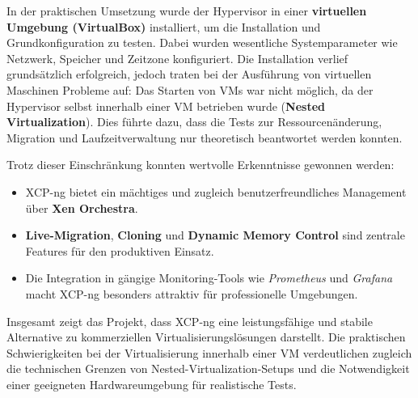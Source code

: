 \documentclass[BMR,Seminar,ngerman,IEEE]{twbook}
\begin{document}
In der praktischen Umsetzung wurde der Hypervisor in einer \textbf{virtuellen Umgebung (VirtualBox)} installiert, um die Installation und Grundkonfiguration zu testen. Dabei wurden wesentliche Systemparameter wie Netzwerk, Speicher und Zeitzone konfiguriert. Die Installation verlief grundsätzlich erfolgreich, jedoch traten bei der Ausführung von virtuellen Maschinen Probleme auf:  
Das Starten von VMs war nicht möglich, da der Hypervisor selbst innerhalb einer VM betrieben wurde (\textbf{Nested Virtualization}). Dies führte dazu, dass die Tests zur Ressourcenänderung, Migration und Laufzeitverwaltung nur theoretisch beantwortet werden konnten.

Trotz dieser Einschränkung konnten wertvolle Erkenntnisse gewonnen werden:
\begin{itemize}[noitemsep]
    \item XCP-ng bietet ein mächtiges und zugleich benutzerfreundliches Management über \textbf{Xen Orchestra}.
    \item \textbf{Live-Migration}, \textbf{Cloning} und \textbf{Dynamic Memory Control} sind zentrale Features für den produktiven Einsatz.
    \item Die Integration in gängige Monitoring-Tools wie \textit{Prometheus} und \textit{Grafana} macht XCP-ng besonders attraktiv für professionelle Umgebungen.
\end{itemize}

Insgesamt zeigt das Projekt, dass XCP-ng eine leistungsfähige und stabile Alternative zu kommerziellen Virtualisierungslösungen darstellt.  
Die praktischen Schwierigkeiten bei der Virtualisierung innerhalb einer VM verdeutlichen zugleich die technischen Grenzen von Nested-Virtualization-Setups und die Notwendigkeit einer geeigneten Hardwareumgebung für realistische Tests.
\end{document}
